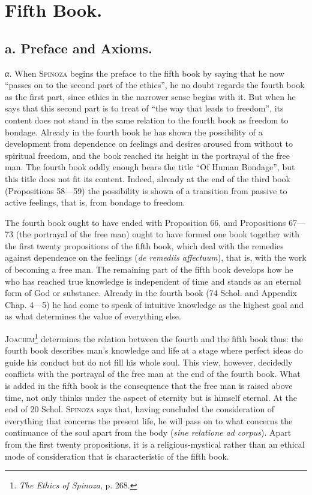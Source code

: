 \documentclass[12pt]{article}
\newcommand{\opage}[1]{\marginnote{\footnotesize\textit{[#1]}}}
\begin{document}
\opage{84}\section*{Fifth Book.}
\subsection*{a. Preface and Axioms.}

\textit{α.} When \textsc{Spinoza} begins the preface to the fifth book by saying that he now
``passes on to the second part of the ethics'', he no doubt regards the fourth book as the first
part, since ethics in the narrower sense begins with it. But when he says that this second part is
to treat of ``the way that leads to freedom'', its content does not stand in the same relation to
the fourth book as freedom to bondage. Already in the fourth book he has shown the possibility of a
development from dependence on feelings and desires aroused from without to spiritual freedom, and
the book reached its height in the portrayal of the free man. The fourth book oddly enough bears
the title ``Of Human Bondage'', but this title does not fit its content. Indeed, already at the end
of the third book (Propositions 58---59) the possibility is shown of a transition from passive to
active feelings, that is, from bondage to freedom.

The fourth book ought to have ended with Proposition 66, and Propositions 67---73 (the portrayal of
the free man) ought to have formed one book together with the first twenty propositions of the
fifth book, which deal with the remedies against dependence on the feelings (\textit{de remediis
affectuum}), that is, with the work of becoming a free man. The remaining part of the fifth book
develops how he who has reached true knowledge is independent of time and stands as an eternal form
of God or substance. Already in the fourth book (74 Schol. and Appendix Chap. 4---5) he had come
to speak of intuitive knowledge as the highest goal and as what determines the value of everything
else.

\textsc{Joachim}\footnote{\textit{The Ethics of Spinoza}, p. 268.} determines the relation between
the fourth and the fifth book thus: the fourth book describes man's knowledge and life at a stage
where perfect ideas do guide his conduct but do not fill his whole soul. %
This view, however, decidedly conflicts with the portrayal of the free man at the end of the fourth
book. What is added in the fifth book is the consequence that the free man is raised above time,
not only thinks under the aspect of eternity but is himself eternal. At the end of 20 Schol.
\textsc{Spinoza} says that, having concluded the consideration of everything that concerns the
present life, he will pass on to what concerns the continuance of the soul apart from the body
(\textit{sine relatione ad corpus}). Apart from the first twenty propositions, it is a
religious-mystical rather than an ethical mode of consideration that is characteristic of the fifth
book.
\end{document}
